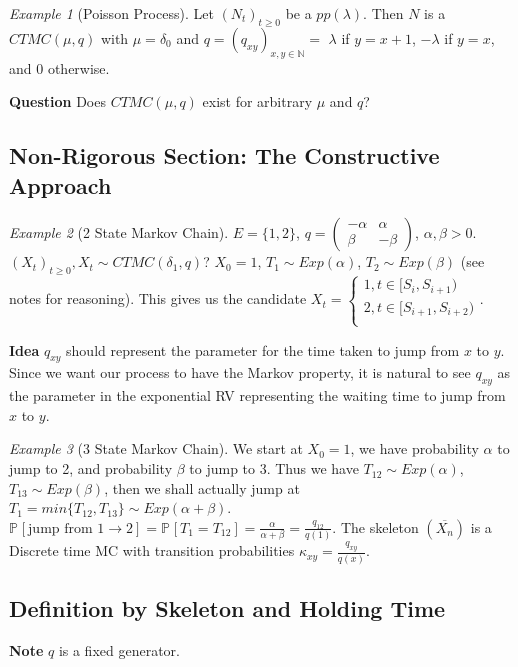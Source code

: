 \documentclass[12pt]{book}
\theoremstyle{definition}
\theoremstyle{remark}
\newtheorem{ex}{Example}[section]
\begin{document}
\begin{ex}[Poisson Process]
	Let $(N_t)_{t\geq 0}$ be a $pp(\lambda)$. Then  $N$ is a $CTMC(\mu, q)$ with  $\mu = \delta_0$ and $q=(q_{xy})_{x,y \in \mathbb{N}}=$ $\lambda$ if $y=x+1$,  $-\lambda$ if  $y=x$, and  $0$ otherwise.
\end{ex}

\textbf{Question} Does $CTMC(\mu, q)$ exist for arbitrary $\mu $ and $q$?

\subsection{Non-Rigorous Section: The Constructive Approach}
\begin{ex}[2 State Markov Chain]
	$E=\{1,2\}$,  $q=
	\begin{pmatrix}
		-\alpha & \alpha \\
		\beta & -\beta
	\end{pmatrix}$, $\alpha, \beta > 0$.
	$(X_t)_{t\geq 0}, X_t \sim CTMC(\delta_1, q)$?
	$X_0 =1$, $T_1 \sim Exp(\alpha)$, $T_2 \sim Exp(\beta)$ (see notes for reasoning). This gives us the candidate $X_t = 
\begin{cases}
1, t \in [S_i, S_{i+1}) \\
2, t \in [S_{i+1}, S_{i+2}) \\
\end{cases}
$.
\end{ex}

\textbf{Idea} $q_{xy}$ should represent the parameter for the time taken to jump from $x$ to $y$. Since we want our process to have the Markov property, it is natural to see $q_{xy}$ as the parameter in the exponential RV representing the waiting time to jump from $x$ to $y$.

\begin{ex}[3 State Markov Chain]
	We start at $X_0 =1$, we have probability  $\alpha $ to jump to 2, and probability $\beta $ to jump to 3. Thus we have $T_{12} \sim Exp(\alpha)$, $T_{13} \sim Exp(\beta )$, then we shall actually jump at $T_1 = min\{T_{12}, T_{13}\} \sim Exp(\alpha + \beta )$. $\mathbb{P}_{} \left[ \textrm{jump from } 1 \to 2 \right] = \mathbb{P}_{} \left[ T_1 = T_{12} \right]= \frac{\alpha }{\alpha + \beta } = \frac{q_{12}}{q(1)} $. The skeleton $(\overline{X_n})$ is a Discrete time MC with transition probabilities $\kappa_{xy}= \frac{q_{xy}}{q(x)}$. 
\end{ex}

\subsection{Definition by Skeleton and Holding Time}
\textbf{Note} $q$ is a fixed generator.
\end{document}

